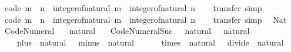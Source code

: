 \begin{isabellebody}
\ {\isacharbrackleft}{\kern0pt}code{\isacharbrackright}{\kern0pt}{\isacharcolon}{\kern0pt}\ {\isachardoublequoteopen}m\ {\isasymle}\ n\ {\isasymlongleftrightarrow}\ integer{\isacharunderscore}{\kern0pt}of{\isacharunderscore}{\kern0pt}natural\ m\ {\isasymle}\ integer{\isacharunderscore}{\kern0pt}of{\isacharunderscore}{\kern0pt}natural\ n{\isachardoublequoteclose}\isanewline
%
\isadelimproof
\ \ %
\endisadelimproof
%
\isatagproof
{}\isamarkupfalse%
\ transfer\ simp%
\endisatagproof
{\isafoldproof}%
%
\isadelimproof
\isanewline
%
\endisadelimproof
\isanewline
{}\isamarkupfalse%
\ {\isacharbrackleft}{\kern0pt}code{\isacharbrackright}{\kern0pt}{\isacharcolon}{\kern0pt}\ {\isachardoublequoteopen}m\ {\isacharless}{\kern0pt}\ n\ {\isasymlongleftrightarrow}\ integer{\isacharunderscore}{\kern0pt}of{\isacharunderscore}{\kern0pt}natural\ m\ {\isacharless}{\kern0pt}\ integer{\isacharunderscore}{\kern0pt}of{\isacharunderscore}{\kern0pt}natural\ n{\isachardoublequoteclose}\isanewline
%
\isadelimproof
\ \ %
\endisadelimproof
%
\isatagproof
{}\isamarkupfalse%
\ transfer\ simp%
\endisatagproof
{\isafoldproof}%
%
\isadelimproof
\isanewline
%
\endisadelimproof
\isanewline
{}\isamarkupfalse%
\ {\isacharparenleft}{\kern0pt}\ Nat\isanewline
\isanewline
{}\isamarkupfalse%
\ Code{\isacharunderscore}{\kern0pt}Numeral\isanewline
\ \ \ natural\isanewline
\ \ \ {\isachardoublequoteopen}Code{\isacharunderscore}{\kern0pt}Numeral{\isachardot}{\kern0pt}Suc{\isachardoublequoteclose}\ {\isachardoublequoteopen}{}\ {\isacharcolon}{\kern0pt}{\isacharcolon}{\kern0pt}\ natural{\isachardoublequoteclose}\ {\isachardoublequoteopen}{}\ {\isacharcolon}{\kern0pt}{\isacharcolon}{\kern0pt}\ natural{\isachardoublequoteclose}\isanewline
\ \ \ \ {\isachardoublequoteopen}plus\ {\isacharcolon}{\kern0pt}{\isacharcolon}{\kern0pt}\ natural\ {\isasymRightarrow}\ {\isacharunderscore}{\kern0pt}{\isachardoublequoteclose}\ {\isachardoublequoteopen}minus\ {\isacharcolon}{\kern0pt}{\isacharcolon}{\kern0pt}\ natural\ {\isasymRightarrow}\ {\isacharunderscore}{\kern0pt}{\isachardoublequoteclose}\isanewline
\ \ \ \ {\isachardoublequoteopen}times\ {\isacharcolon}{\kern0pt}{\isacharcolon}{\kern0pt}\ natural\ {\isasymRightarrow}\ {\isacharunderscore}{\kern0pt}{\isachardoublequoteclose}\ {\isachardoublequoteopen}divide\ {\isacharcolon}{\kern0pt}{\isacharcolon}{\kern0pt}\ natural\ {\isasymRightarrow}\ {\isacharunderscore}{\kern0pt}{\isachardoublequoteclose}\isanewline

\end{isabellebody}

